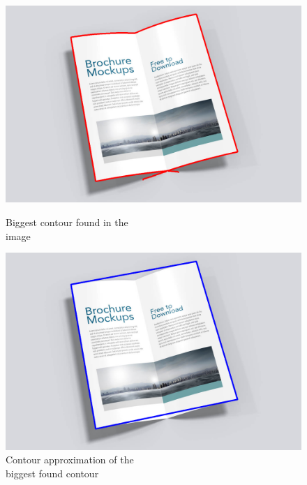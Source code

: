 \begin{figure}[H]
     \centering
     \captionsetup{justification=centering}
     \begin{minipage}[t]{0.5\textwidth}
        \centering
        \includegraphics[width=.95\textwidth]{images/3_folded_doc/contours.png}
        \caption{Biggest contour found in the \\image}
        \label{fig:doc_approx}
     \end{minipage}%
     \begin{minipage}[t]{0.5\textwidth}
         \centering
         \includegraphics[width=.95\textwidth]{images/3_folded_doc/contours_approx.png}
         \caption{Contour approximation of the \\biggest found contour}
        \label{fig:doc_found_all_corn}
     \end{minipage}
\end{figure}




